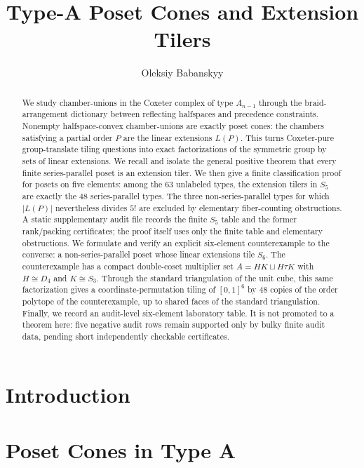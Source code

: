 \documentclass[11pt,a4paper]{article}
\title{Type-A Poset Cones and Extension Tilers}
\author{Oleksiy Babanskyy}
\date{}
\theoremstyle{definition}
\begin{document}
\pagestyle{plain}

\maketitle

\begin{abstract}
We study chamber-unions in the Coxeter complex of type $A_{n-1}$ through
the braid-arrangement dictionary between reflecting halfspaces and
precedence constraints.  Nonempty halfspace-convex chamber-unions are
exactly poset cones: the chambers satisfying a partial order $P$ are the
linear extensions $L(P)$.  This turns Coxeter-pure group-translate tiling
questions into exact factorizations of the symmetric group by sets of
linear extensions.  We recall and isolate the general positive theorem
that every finite series-parallel poset is an extension tiler.  We then
give a finite classification proof for posets on five elements: among
the $63$ unlabeled types, the extension tilers in $S_5$ are exactly the
$48$ series-parallel types.  The three non-series-parallel types for
which $|L(P)|$ nevertheless divides $5!$ are excluded by elementary
fiber-counting obstructions.  A static supplementary audit file records the
finite $S_5$ table and the former rank/packing certificates; the proof
itself uses only the finite table and elementary obstructions.  We formulate
and verify an explicit six-element counterexample to the converse: a
non-series-parallel poset whose linear extensions tile $S_6$.  The
counterexample has a compact double-coset multiplier set
$A=HK\sqcup H\tau K$ with $H\cong D_4$ and $K\cong S_3$.  Through the
standard triangulation of the unit cube, this same factorization gives a
coordinate-permutation tiling of $[0,1]^6$ by $48$ copies of the order
polytope of the counterexample, up to shared faces of the standard
triangulation.  Finally, we record an audit-level six-element laboratory
table.  It is not promoted to a theorem here: five negative audit rows
remain supported only by bulky finite audit data, pending short
independently checkable certificates.
\end{abstract}

\section{Introduction}


\section{Poset Cones in Type A}

\end{document}
